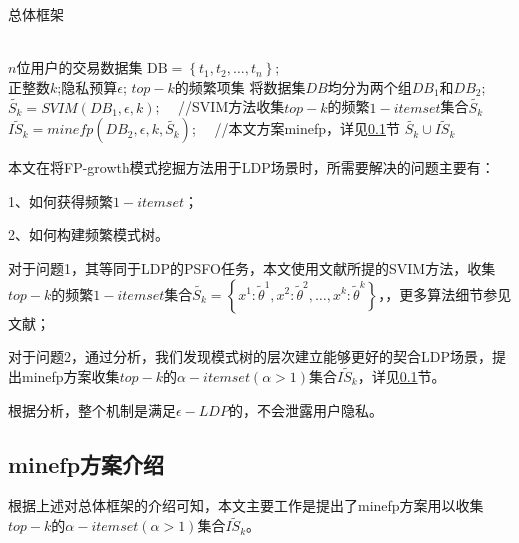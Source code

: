 \documentclass[UTF8]{ctexart}
\begin{document}
\begin{algorithm}[htbp]
    \caption{总体框架}
    \label{alg:fullstep}
        \begin{algorithmic}[1]
        \REQUIRE ~~\\
        $n$位用户的交易数据集 $\mathrm{DB}=\left\{t_{1}, t_{2}, \ldots, t_{n}\right\}$;\\
        正整数$k$;隐私预算$\epsilon$;
        \ENSURE $top-k$的频繁项集
        \STATE 将数据集$DB$均分为两个组$D B_{1}$和$D B_{2}$;
        \label{fullstep:group}
			 \STATE $\tilde{S_k} = SVIM(DB_1,\epsilon,k)$; \ \  //SVIM\cite{wang2018locally}方法收集$top-k$的频繁$1-itemset$集合$\tilde{S_k}$
        \label{fullstep:SVIM}
			 \STATE $\tilde{IS_k} = minefp(DB_2,\epsilon,k,\tilde{S_k})$; \ \  //本文方案minefp，详见\ref{section:minefp}节
			 \label{fullstep:minefp}
        \RETURN $\tilde{S_k} \cup \tilde{IS_k}$
        \end{algorithmic}
\end{algorithm}

本文在将FP-growth模式挖掘方法用于LDP场景时，所需要解决的问题主要有：

1、如何获得频繁$1-itemset$；

2、如何构建频繁模式树。

对于问题1，其等同于LDP的PSFO任务，本文使用文献\cite{wang2018locally}所提的SVIM方法，收集$top-k$的频繁$1-itemset$集合$\tilde{S_k}=\left\{x^{1}: \tilde{\theta}^{1}, x^{2}: \tilde{\theta}^{2}, \ldots, x^{k}: \tilde{\theta}^{k}\right\}$，，更多算法细节参见文献；

对于问题2，通过分析，我们发现模式树的层次建立能够更好的契合LDP场景，提出minefp方案收集$top-k$的$\alpha -itemset(\alpha>1)$集合$\tilde{IS_k}$，详见\ref{section:minefp}节。

根据分析，整个机制是满足$\epsilon-LDP$的，不会泄露用户隐私。


\subsection{minefp方案介绍}
\label{section:minefp}
根据上述对总体框架的介绍可知，本文主要工作是提出了minefp方案用以收集$top-k$的$\alpha -itemset(\alpha>1)$集合$\tilde{IS_k}$。
\end{document}
